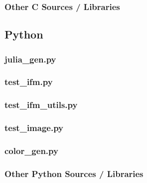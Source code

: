 \documentclass{article}
\begin{document}
\subsubsection{Other C Sources / Libraries}

\subsection{Python}
\subsubsection{julia\_gen.py}						%
\subsubsection{test\_ifm.py}						%
\subsubsection{test\_ifm\_utils.py}				%
\subsubsection{test\_image.py} 					%
\subsubsection{color\_gen.py} 						%
\subsubsection{Other Python Sources / Libraries}
\end{document}
